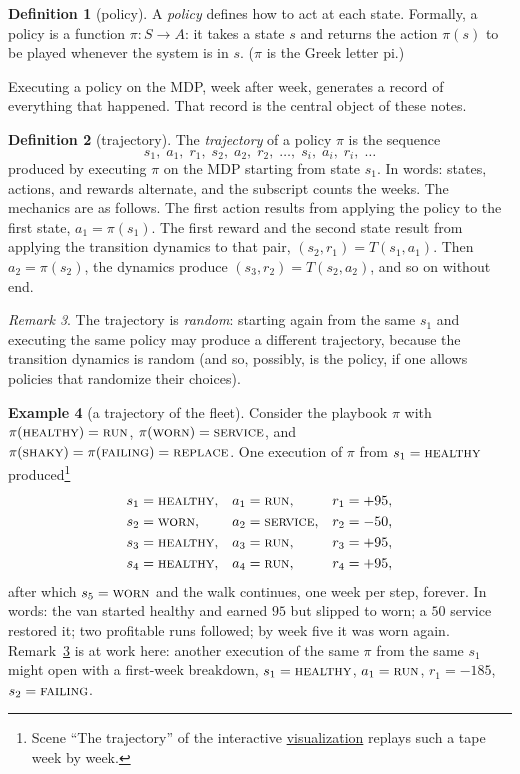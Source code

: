 \documentclass[11pt,a4paper]{article}
\theoremstyle{definition}
\newtheorem{definition}{Definition}[section]
\newtheorem{example}[definition]{Example}
\theoremstyle{remark}
\newtheorem{remark}[definition]{Remark}
\numberwithin{equation}{section}
\newcommand{\sa}[1]{\textsc{#1}}   %
\newcommand{\vizhref}[1]{\href{https://eth-ainit-fs26.github.io/rl-arcade/repair-or-replace/}{#1}}
\begin{document}
\begin{definition}[policy]
A \emph{policy} defines how to act at each state. Formally, a policy is a function
$\pi \colon S \to A$: it takes a state $s$ and returns the action $\pi(s)$ to be played
whenever the system is in $s$. ($\pi$ is the Greek letter pi.)
\end{definition}

Executing a policy on the MDP, week after week, generates a record of everything that
happened. That record is the central object of these notes.

\begin{definition}[trajectory]
The \emph{trajectory} of a policy $\pi$ is the sequence
\[
s_1,\; a_1,\; r_1,\; s_2,\; a_2,\; r_2,\; \dots,\; s_i,\; a_i,\; r_i,\; \dots
\]
produced by executing $\pi$ on the MDP starting from state $s_1$. In words: states, actions,
and rewards alternate, and the subscript counts the weeks. The mechanics are as follows. The
first action results from applying the policy to the first state, $a_1 = \pi(s_1)$. The first
reward and the second state result from applying the transition dynamics to that pair,
$(s_2, r_1) = T(s_1, a_1)$. Then $a_2 = \pi(s_2)$, the dynamics produce
$(s_3, r_2) = T(s_2, a_2)$, and so on without end.
\end{definition}

\begin{remark}\label{rem:randomtraj}
The trajectory is \emph{random}: starting again from the same $s_1$ and executing the same
policy may produce a different trajectory, because the transition dynamics is random (and so,
possibly, is the policy, if one allows policies that randomize their choices).
\end{remark}

\begin{example}[a trajectory of the fleet]\label{ex:trajectory}
Consider the playbook $\pi$ with $\pi(\sa{healthy}) = \sa{run}$,
$\pi(\sa{worn}) = \sa{service}$, and $\pi(\sa{shaky}) = \pi(\sa{failing}) = \sa{replace}$.
One execution of $\pi$ from $s_1 = \sa{healthy}$ produced\footnote{Scene ``The trajectory''
of the interactive \vizhref{visualization} replays such a tape week by week.}
\begin{align*}
s_1 &= \sa{healthy}, & a_1 &= \sa{run},     & r_1 &= +95,\\
s_2 &= \sa{worn},    & a_2 &= \sa{service}, & r_2 &= -50,\\
s_3 &= \sa{healthy}, & a_3 &= \sa{run},     & r_3 &= +95,\\
s_4 &= \sa{healthy}, & a_4 &= \sa{run},     & r_4 &= +95,
\end{align*}
after which $s_5 = \sa{worn}$ and the walk continues, one week per step, forever. In words:
the van started healthy and earned $95$ but slipped to worn; a $50$ service restored it; two
profitable runs followed; by week five it was worn again. Remark~\ref{rem:randomtraj} is at
work here: another execution of the same $\pi$ from the same $s_1$ might open with a
first-week breakdown, $s_1 = \sa{healthy}$, $a_1 = \sa{run}$, $r_1 = -185$,
$s_2 = \sa{failing}$.
\end{example}
\end{document}
